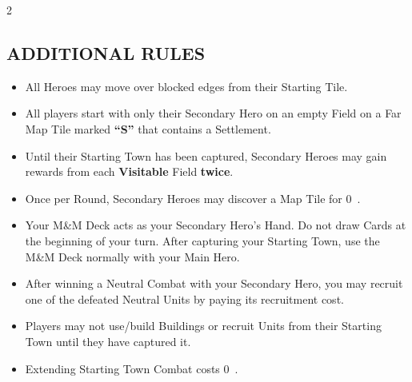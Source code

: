 \begin{multicols}{2}
\columnbreak

\subsection*{\MakeUppercase{Additional Rules}}
\begin{itemize}
  \item All Heroes may move over blocked edges from their Starting Tile.
  \item All players start with only their Secondary Hero on an empty Field on a Far Map Tile marked \textbf{``S''} that contains a Settlement.
  \item Until their Starting Town has been captured, Secondary Heroes may gain rewards from each \textbf{Visitable} Field \textbf{twice}.
  \item Once per Round, Secondary Heroes may discover a Map Tile for 0~.
  \item Your M\&M Deck acts as your Secondary Hero's Hand.  Do not draw Cards at the beginning of your turn. After capturing your Starting Town, use the M\&M Deck normally with your Main Hero.
  \item After winning a Neutral Combat with your Secondary Hero, you may recruit one of the defeated Neutral Units by paying its recruitment cost.
  \item Players may not use/build Buildings or recruit Units from their Starting Town until they have captured it.
  \item Extending Starting Town Combat costs 0~.

\columnbreak


\end{itemize}
\end{multicols}
